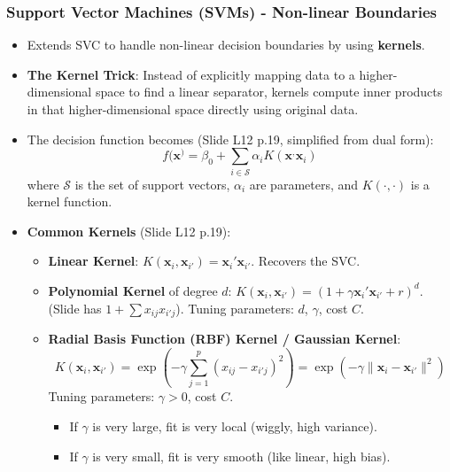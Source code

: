 \documentclass[12pt,a4paper]{article}
\begin{document}
    \subsubsection{Support Vector Machines (SVMs) - Non-linear Boundaries }
        \begin{itemize}
            \item Extends SVC to handle non-linear decision boundaries by using \textbf{kernels}.
            \item \textbf{The Kernel Trick}: Instead of explicitly mapping data to a higher-dimensional space to find a linear separator, kernels compute inner products in that higher-dimensional space directly using original data.
            \item The decision function becomes (Slide L12 p.19, simplified from dual form):
                $$ f(\mathbf{x}^) = \beta_0 + \sum_{i \in \mathcal{S}} \alpha_i K(\mathbf{x}^, \mathbf{x}_i) $$
                where $\mathcal{S}$ is the set of support vectors, $\alpha_i$ are parameters, and $K(\cdot, \cdot)$ is a kernel function.
            \item \textbf{Common Kernels} (Slide L12 p.19):
                \begin{itemize}
                    \item \textbf{Linear Kernel}: $K(\mathbf{x}_i, \mathbf{x}_{i'}) = \mathbf{x}_i' \mathbf{x}_{i'}$. Recovers the SVC.
                    \item \textbf{Polynomial Kernel} of degree $d$: $K(\mathbf{x}_i, \mathbf{x}_{i'}) = (1 + \gamma \mathbf{x}_i' \mathbf{x}_{i'} + r)^d$. (Slide has $1 + \sum x_{ij}x_{i'j}$). Tuning parameters: $d$, $\gamma$, cost $C$.
                    \item \textbf{Radial Basis Function (RBF) Kernel / Gaussian Kernel}:
                        $$ K(\mathbf{x}_i, \mathbf{x}_{i'}) = \exp\left(-\gamma \sum_{j=1}^p (x_{ij} - x_{i'j})^2\right) = \exp(-\gamma \|\mathbf{x}_i - \mathbf{x}_{i'}\|^2) $$
                        Tuning parameters: $\gamma > 0$, cost $C$.
                        \begin{itemize}
                            \item If $\gamma$ is very large, fit is very local (wiggly, high variance).
                            \item If $\gamma$ is very small, fit is very smooth (like linear, high bias).
                        \end{itemize}
                \end{itemize}
        \end{itemize}
\end{document}
